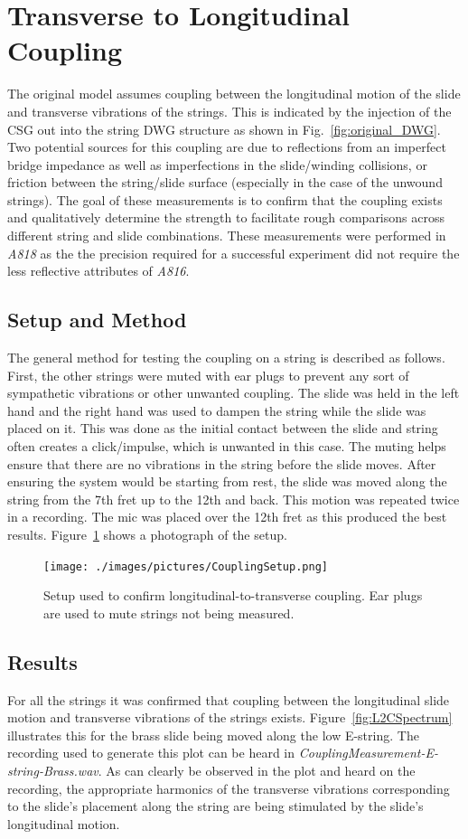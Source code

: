 \documentclass[../main.tex]{subfiles}
\begin{document}
\section{Transverse to Longitudinal Coupling}
The original model assumes coupling between the longitudinal motion of the slide and transverse vibrations of the strings. This is indicated by the injection of the CSG out into the string DWG structure as shown in Fig.~\ref{fig:original_DWG}. Two potential sources for this coupling are due to reflections from an imperfect bridge impedance as well as imperfections in the slide/winding collisions, or friction between the string/slide surface (especially in the case of the unwound strings). The goal of these measurements is to confirm that the coupling exists and qualitatively determine the strength to facilitate rough comparisons across different string and slide combinations. These measurements were performed in \emph{A818} as the the precision required for a successful experiment did not require the less reflective attributes of \emph{A816}.

\subsection{Setup and Method}
The general method for testing the coupling on a string is described as follows. First, the other strings were muted with ear plugs to prevent any sort of sympathetic vibrations or other unwanted coupling. The slide was held in the left hand and the right hand was used to dampen the string while the slide was placed on it. This was done as the initial contact between the slide and string often creates a click/impulse, which is unwanted in this case. The muting helps ensure that there are no vibrations in the string before the slide moves. After ensuring the system would be starting from rest, the slide was moved along the string from the 7th fret up to the 12th and back. This motion was repeated twice in a recording. The mic was placed over the 12th fret as this produced the best results. Figure~\ref{fig:CouplingSetup} shows a photograph of the setup.

\begin{figure}[h]
    \centering
    \texttt{[image: ./images/pictures/CouplingSetup.png]}
    \caption{Setup used to confirm longitudinal-to-transverse coupling. Ear plugs are used to mute strings not being measured.}
    \label{fig:CouplingSetup}
\end{figure}

\subsection{Results}
For all the strings it was confirmed that coupling between the longitudinal slide motion and transverse vibrations of the strings exists. Figure~\ref{fig:L2CSpectrum} illustrates this for the brass slide being moved along the low E-string. The recording used to generate this plot can be heard in \emph{CouplingMeasurement-E-string-Brass.wav}. As can clearly be observed in the plot and heard on the recording, the appropriate harmonics of the transverse vibrations corresponding to the slide's placement along the string are being stimulated by the slide's longitudinal motion.
\end{document}
